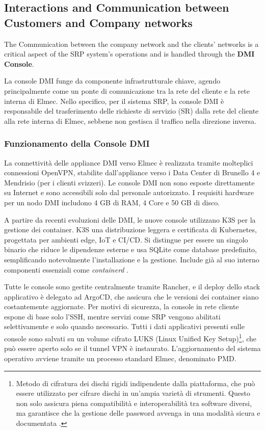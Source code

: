 \subsection{Interactions and Communication between Customers and Company networks}
The Communication between the company network and the clients' networks is a critical aspect of the SRP system's operations and is handled through the \textbf{DMI Console}.

La console DMI funge da componente infrastrutturale chiave, agendo principalmente come un ponte di comunicazione tra la rete del cliente e la rete interna di Elmec. Nello specifico, per il sistema SRP, la console DMI è responsabile del trasferimento delle richieste di servizio (SR) dalla rete del cliente alla rete interna di Elmec, sebbene non gestisca il traffico nella direzione inversa.

\subsubsection{Funzionamento della Console DMI}
La connettività delle appliance DMI verso Elmec è realizzata tramite molteplici connessioni OpenVPN, stabilite dall'appliance verso i Data Center di Brunello 4 e Mendrisio (per i clienti svizzeri). Le console DMI non sono esposte direttamente su Internet e sono accessibili solo dal personale autorizzato. I requisiti hardware per un nodo DMI includono 4 GB di RAM, 4 Core e 50 GB di disco.

A partire da recenti evoluzioni delle DMI, le nuove console utilizzano K3S per la gestione dei container. K3S una distribuzione leggera e certificata di Kubernetes, progettata per ambienti edge, IoT e CI/CD. Si distingue per essere un singolo binario che riduce le dipendenze esterne e usa SQLite come database predefinito, semplificando notevolmente l'installazione e la gestione. Include già al suo interno componenti essenziali come \textit{containerd} \cite{k3s}.

Tutte le console sono gestite centralmente tramite Rancher, e il deploy dello stack applicativo è delegato ad ArgoCD, che assicura che le versioni dei container siano costantemente aggiornate. Per motivi di sicurezza, la console in rete cliente espone di base solo l'SSH, mentre servizi come SRP vengono abilitati selettivamente e solo quando necessario. Tutti i dati applicativi presenti sulle console sono salvati su un volume cifrato LUKS (Linux Unified Key Setup)\footnote{Metodo di cifratura dei dischi rigidi indipendente dalla piattaforma, che può essere utilizzato per cifrare dischi in un'ampia varietà di strumenti. Questo non solo assicura piena compatibilità e interoperabilità tra software diversi, ma garantisce che la gestione delle password avvenga in una modalità sicura e documentata \cite{luks}.}, che può essere aperto solo se il tunnel VPN è instaurato. L'aggiornamento del sistema operativo avviene tramite un processo standard Elmec, denominato PMD.

